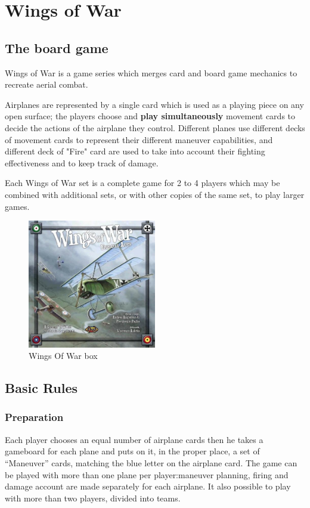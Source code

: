 \documentclass[12pt]{report}
\begin{document}
\chapter{Wings of War}

\section{The board game}

Wings of War is a game series which merges card and board game mechanics to recreate aerial combat.

Airplanes are represented by a single card which is used as a playing piece on any open surface; the players choose and \textbf{play simultaneously} movement cards to decide the actions of the airplane they control. Different planes use different decks of movement cards to represent their different maneuver capabilities, and different deck of "Fire" card are used to take into account their fighting effectiveness and to keep track of damage.

Each Wings of War set is a complete game for 2 to 4 players which may be combined with additional sets, or with other copies of the same set, to play larger games.

\begin{figure}
  \centering
      \includegraphics[width=0.5\textwidth]{images/wow.jpg}
  \caption{Wings Of War box}
\end{figure}

\section{Basic Rules}
\subsection{Preparation}
Each player chooses an equal number of airplane cards then he takes a gameboard for each plane and puts on it, in the proper place, a set of “Maneuver” cards, matching the blue letter on the airplane card.
The game can be played with more than one plane per player:maneuver planning, firing and damage account are made separately for each airplane. It also possible to play with more than two players, divided into teams.
\end{document}
